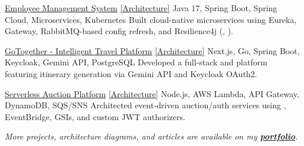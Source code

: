 \vspace{-0.3em}
\cvprojectsingle
{\href{https://github.com/UchihaIthachi/EMS}{Employee Management System} {\scriptsize\href{https://UchihaIthachi.github.io/cv/arch/ems.png}{[Architecture]}}}
{Java 17, Spring Boot, Spring Cloud, Microservices, Kubernetes}
{Built cloud-native microservices using Eureka, Gateway, RabbitMQ-based config refresh, and Resilience4j (, ).}

\cvprojectsingle
{\href{https://github.com/UchihaIthachi/GoTogether}{GoTogether - Intelligent Travel Platform} {\scriptsize\href{https://UchihaIthachi.github.io/cv/arch/gotogether.png}{[Architecture]}}}
{Next.js, Go, Spring Boot, Keycloak, Gemini API, PostgreSQL}
{Developed a full-stack  and  platform featuring  itinerary generation via Gemini API and Keycloak OAuth2.}


\cvprojectsingle
{\href{https://github.com/UchihaIthachi/serverless-auction-platform}{Serverless Auction Platform} {\scriptsize\href{https://UchihaIthachi.github.io/cv/arch/serverless_auction.png}{[Architecture]}}}
{Node.js, AWS Lambda, API Gateway, DynamoDB, SQS/SNS}
{Architected event-driven auction/auth services using , EventBridge,  GSIs, and custom JWT authorizers.}


\vspace{0.3em}
\noindent \textit{More projects, architecture diagrams, and articles are available on my \href{https://harshanalf.netlify.app/portfolio}{\textbf{portfolio}}.}
